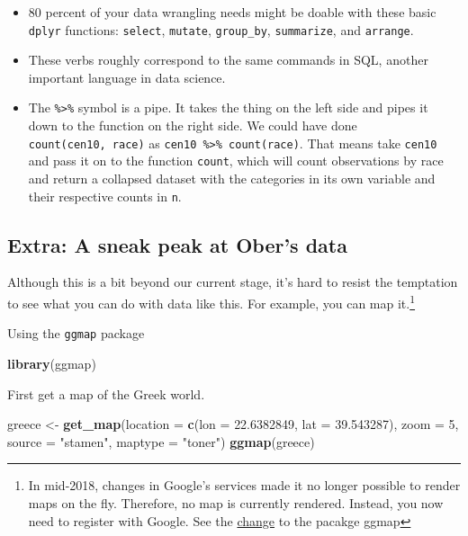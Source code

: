 \documentclass[]{book}
\newenvironment{Shaded}{\begin{snugshade}}{\end{snugshade}}
\newcommand{\DataTypeTok}[1]{\textcolor[rgb]{0.13,0.29,0.53}{#1}}
\newcommand{\DecValTok}[1]{\textcolor[rgb]{0.00,0.00,0.81}{#1}}
\newcommand{\FloatTok}[1]{\textcolor[rgb]{0.00,0.00,0.81}{#1}}
\newcommand{\KeywordTok}[1]{\textcolor[rgb]{0.13,0.29,0.53}{\textbf{#1}}}
\newcommand{\NormalTok}[1]{#1}
\newcommand{\StringTok}[1]{\textcolor[rgb]{0.31,0.60,0.02}{#1}}
\providecommand{\tightlist}{%
  \setlength{\itemsep}{0pt}\setlength{\parskip}{0pt}}
\let\rmarkdownfootnote\footnote%
\def\footnote{\protect\rmarkdownfootnote}
\theoremstyle{definition}
\theoremstyle{definition}
\theoremstyle{definition}
\theoremstyle{remark}
\begin{document}
\begin{itemize}
\tightlist
\item
  80 percent of your data wrangling needs might be doable with these basic \texttt{dplyr} functions: \texttt{select}, \texttt{mutate}, \texttt{group\_by}, \texttt{summarize}, and \texttt{arrange}.
\item
  These verbs roughly correspond to the same commands in SQL, another important language in data science.
\item
  The \texttt{\%\textgreater{}\%} symbol is a pipe. It takes the thing on the left side and pipes it down to the function on the right side. We could have done \texttt{count(cen10,\ race)} as \texttt{cen10\ \%\textgreater{}\%\ count(race)}. That means take \texttt{cen10} and pass it on to the function \texttt{count}, which will count observations by race and return a collapsed dataset with the categories in its own variable and their respective counts in \texttt{n}.
\end{itemize}

\hypertarget{extra-a-sneak-peak-at-obers-data}{%
\subsection{Extra: A sneak peak at Ober's data}\label{extra-a-sneak-peak-at-obers-data}}

Although this is a bit beyond our current stage, it's hard to resist the temptation to see what you can do with data like this. For example, you can map it.\footnote{In mid-2018, changes in Google's services made it no longer possible to render maps on the fly. Therefore, no map is currently rendered. Instead, you now need to register with Google. See the \href{https://github.com/dkahle/ggmap/blob/e55c0b22b0d16a010b4b45dd2fce800ff0ef19b8/NEWS\#L6-L12}{change} to the pacakge ggmap }

Using the \texttt{ggmap} package

\begin{Shaded}
\begin{Highlighting}[]
\KeywordTok{library}\NormalTok{(ggmap)}
\end{Highlighting}
\end{Shaded}

First get a map of the Greek world.

\begin{Shaded}
\begin{Highlighting}[]
\NormalTok{greece <-}\StringTok{ }\KeywordTok{get_map}\NormalTok{(}\DataTypeTok{location =} \KeywordTok{c}\NormalTok{(}\DataTypeTok{lon =} \FloatTok{22.6382849}\NormalTok{, }\DataTypeTok{lat =} \FloatTok{39.543287}\NormalTok{),}
                  \DataTypeTok{zoom =} \DecValTok{5}\NormalTok{, }
                  \DataTypeTok{source =} \StringTok{"stamen"}\NormalTok{,}
                  \DataTypeTok{maptype =} \StringTok{"toner"}\NormalTok{)}
\KeywordTok{ggmap}\NormalTok{(greece)}
\end{Highlighting}
\end{Shaded}
\end{document}
